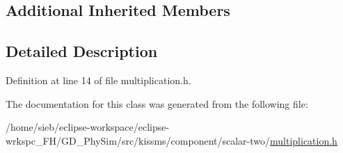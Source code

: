 \subsection*{Additional Inherited Members}


\subsection{Detailed Description}


Definition at line 14 of file multiplication.\-h.



The documentation for this class was generated from the following file\-:\begin{DoxyCompactItemize}
\item 
/home/sieb/eclipse-\/workspace/eclipse-\/wrkspc\-\_\-\-F\-H/\-G\-D\-\_\-\-Phy\-Sim/src/kissms/component/scalar-\/two/\hyperlink{multiplication_8h}{multiplication.\-h}\end{DoxyCompactItemize}
